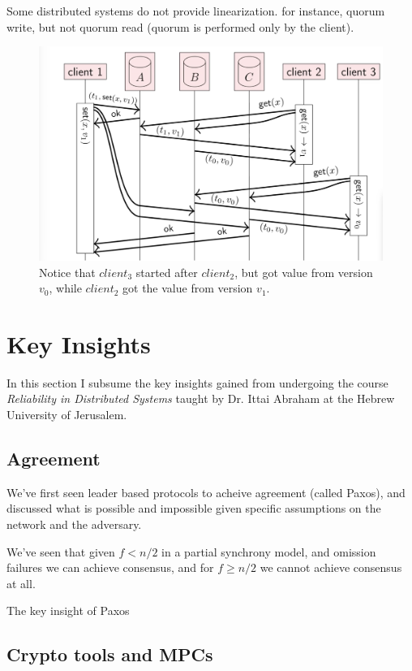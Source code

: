 Some distributed systems do not provide linearization. 
for instance, quorum write, but not quorum read (quorum is performed only by the client).

\begin{figure}[t]
    \centering
    \includegraphics[scale=0.25]{computer-sceince/distributed-media/linearization-failure.png}
    \caption{Notice that $client_3$ started after $client_2$, but got value
    from version $v_0$, while $client_2$ got the value from version $v_1$.
    }
\end{figure}





\section{Key Insights}
In this section I subsume the key insights gained from undergoing the course \emph{Reliability in Distributed Systems}
taught by Dr. Ittai Abraham at the Hebrew University of Jerusalem.

\subsection{Agreement}
We've first seen leader based protocols to acheive agreement (called Paxos), and discussed 
what is possible and impossible given specific assumptions on the network and the adversary.

We've seen that given $f<n/2$ in a partial synchrony model, and omission failures we can achieve consensus,
and for $f\ge n/2$ we cannot achieve consensus at all.

The key insight of Paxos 
\subsection{Crypto tools and MPCs}